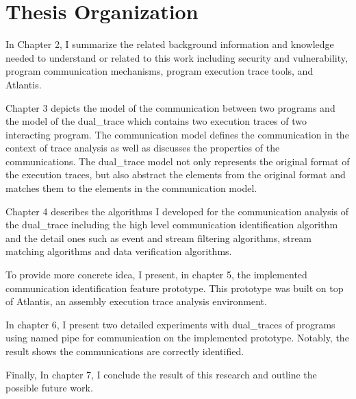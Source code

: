 \section{Thesis Organization}
In Chapter 2, I summarize the related background information and knowledge needed to understand or related to this work including security and vulnerability, program communication mechanisms, program execution trace tools, and Atlantis. 

Chapter 3 depicts the model of the communication between two programs and the model of the dual\_trace which contains two execution traces of two interacting program. The communication model defines the communication in the context of trace analysis as well as discusses the properties of the communications. The dual\_trace model not only represents the original format of the execution traces, but also abstract the elements from the original format and matches them to the elements in the communication model. 


Chapter 4 describes the algorithms I developed for the communication analysis of the dual\_trace including the high level communication identification algorithm and the detail ones such as event and stream filtering algorithms, stream matching algorithms and data verification algorithms.

To provide more concrete idea, I present, in chapter 5, the implemented communication identification feature prototype. This prototype was built on top of Atlantis\cite{huang2017atlantis}, an assembly execution trace analysis environment.

In chapter 6, I present two detailed experiments with dual\_traces of programs using named pipe for communication on the implemented prototype. Notably, the result shows the communications are correctly identified. 

Finally, In chapter 7, I conclude the result of this research and outline the possible future work.